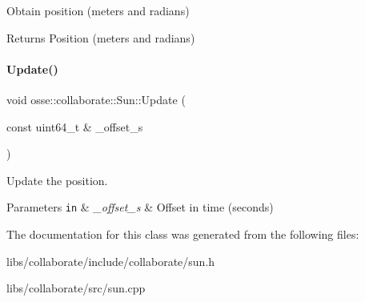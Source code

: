 Obtain position (meters and radians) 

\begin{DoxyReturn}{Returns}
Position (meters and radians) 
\end{DoxyReturn}
\mbox{\label{classosse_1_1collaborate_1_1_sun_a917e9e3cce61142249bb53157a299b09}} 
\paragraph{\texorpdfstring{Update()}{Update()}}
{\footnotesize\ttfamily void osse\+::collaborate\+::\+Sun\+::\+Update (\begin{DoxyParamCaption}\item[{const uint64\+\_\+t \&}]{\+\_\+offset\+\_\+s }\end{DoxyParamCaption})}



Update the position. 


\begin{DoxyParams}[1]{Parameters}
\mbox{\tt in}  & {\em \+\_\+offset\+\_\+s} & Offset in time (seconds) \\
\hline
\end{DoxyParams}


The documentation for this class was generated from the following files\+:\begin{DoxyCompactItemize}
\item 
libs/collaborate/include/collaborate/sun.\+h\item 
libs/collaborate/src/sun.\+cpp\end{DoxyCompactItemize}
